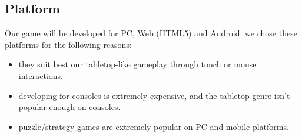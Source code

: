 \subsection{Platform}
Our game will be developed for PC, Web (HTML5) and Android: we chose these platforms for the following reasons:
\begin{itemize}
	\item they suit best our tabletop-like gameplay through touch or mouse interactions.
	\item developing for consoles is extremely expensive, and the tabletop genre isn't popular enough on consoles.
	\item puzzle/strategy games are extremely popular on PC and mobile platforms.
\end{itemize}

\clearpage